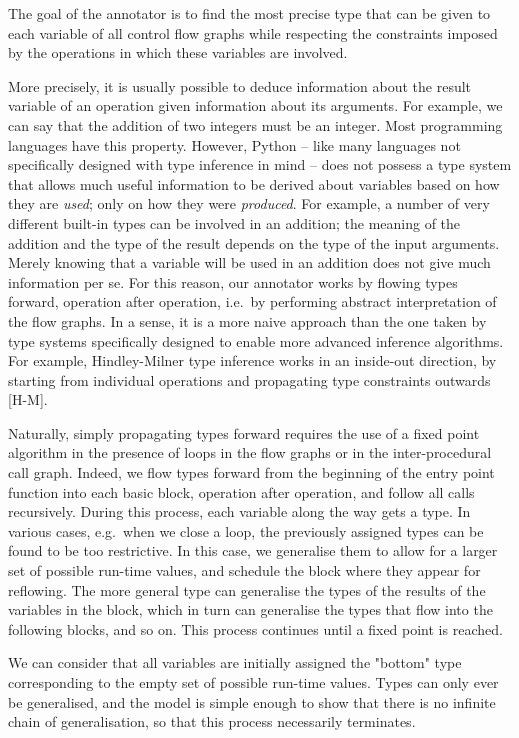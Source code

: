 \documentclass{acm_proc_article-sp}
\begin{document}
The goal of the annotator is to find the most precise type that can be
given to each variable of all control flow graphs while respecting the
constraints imposed by the operations in which these variables are
involved.

More precisely, it is usually possible to deduce information about the
result variable of an operation given information about its arguments.
For example, we can say that the addition of two integers must be an
integer.  Most programming languages have this property.  However,
Python -- like many languages not specifically designed with type
inference in mind -- does not possess a type system that allows much
useful information to be derived about variables based on how they are
\textit{used}; only on how they were \textit{produced}.  For example, a number of very
different built-in types can be involved in an addition; the meaning of
the addition and the type of the result depends on the type of the input
arguments.  Merely knowing that a variable will be used in an addition
does not give much information per se.  For this reason, our annotator
works by flowing types forward, operation after operation, i.e.\ by
performing abstract interpretation of the flow graphs.  In a sense, it
is a more naive approach than the one taken by type systems specifically
designed to enable more advanced inference algorithms.  For example,
Hindley-Milner type inference works in an inside-out direction, by
starting from individual operations and propagating type constraints
outwards [H-M].

Naturally, simply propagating types forward requires the use of a fixed
point algorithm in the presence of loops in the flow graphs or in the
inter-procedural call graph.  Indeed, we flow types forward from the
beginning of the entry point function into each basic block, operation
after operation, and follow all calls recursively.  During this process,
each variable along the way gets a type.  In various cases, e.g.\ when we
close a loop, the previously assigned types can be found to be too
restrictive.  In this case, we generalise them to allow for a larger set
of possible run-time values, and schedule the block where they appear
for reflowing.  The more general type can generalise the types of the
results of the variables in the block, which in turn can generalise the
types that flow into the following blocks, and so on.  This process
continues until a fixed point is reached.

We can consider that all variables are initially assigned the "bottom"
type corresponding to the empty set of possible run-time values.  Types
can only ever be generalised, and the model is simple enough to show
that there is no infinite chain of generalisation, so that this process
necessarily terminates.
\end{document}
